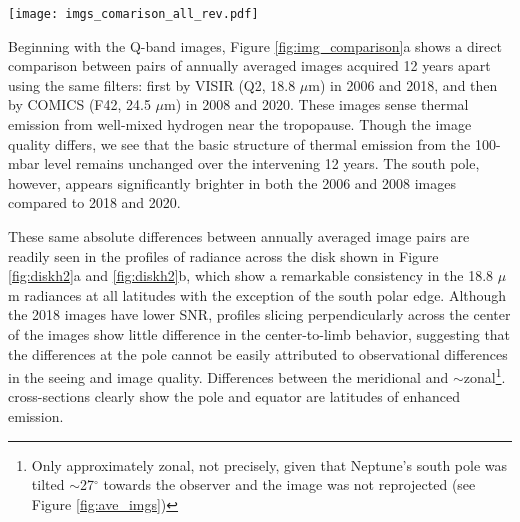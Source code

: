 \documentclass[twocolumn,10pt]{aastex631}
\begin{document}
\begin{figure*}
    \centering
    \texttt{[image: imgs\_comarison\_all\_rev.pdf]}
    \caption{Comparison of observed radiances in images from different years. On the left, images with identical filters are compared over time in the different spectral regions as described in the text for images sensitive to a) H$_2$, b) C$_2$H$_6$, c) CH$_3$D, and d) CH$_4$.  On the right, image sequences including all filters, normalized relative to Spitzer disk-filter-integrated radiances and scaled by a single fiducial value for each spectral group---specifically the Spitzer filter-integrated values for Q2 (H$_2$), NeII$\_$1 (C$_2$H$_6$),  PAH1 (CH$_3$D), and J7.9 (CH$_4$). Variation in methane images d) are largest, and indicate significant global changes in radiances or larger calibration uncertainties than expected. Uncertainties are assumed to be up to 10\% for ethane images (11--13 $\mu$m), 20\% for the CH$_3$D images (8--9 $\mu$m), 25\% for methane images (7--8 $\mu$m), and no more than 30\% for hydrogen images (17--25 $\mu$m). }
    \label{fig:img_comparison}
\end{figure*}

Beginning with the Q-band images, Figure \ref{fig:img_comparison}a shows a direct comparison between pairs of annually averaged images acquired 12 years apart using the same filters:  first by VISIR (Q2, 18.8 $\mu$m) in 2006 and 2018, and then by COMICS (F42, 24.5 $\mu$m) in 2008 and 2020. These images sense thermal emission from well-mixed hydrogen near the tropopause. Though the image quality differs, we see that the basic structure of thermal emission from the 100-mbar level remains unchanged over the intervening 12 years.  The south pole, however, appears significantly brighter in both the 2006 and 2008 images compared to 2018 and 2020.  

These same absolute differences between annually averaged image pairs are readily seen in the profiles of radiance across the disk shown in Figure \ref{fig:diskh2}a and \ref{fig:diskh2}b, which show a remarkable consistency in the 18.8 $\mu$m radiances at all latitudes with the exception of the south polar edge. Although the 2018 images have lower SNR, profiles slicing perpendicularly across the center of the images show little difference in the center-to-limb behavior, suggesting that the differences at the pole cannot be easily attributed to observational differences in the seeing and image quality. Differences between the meridional and $\sim$zonal\footnote{Only approximately zonal, not precisely, given that Neptune's south pole was tilted $\sim$27$^{\circ}$ towards the observer and the image was not reprojected (see Figure \ref{fig:ave_imgs})}. cross-sections clearly show the pole and equator are latitudes of enhanced emission.  
\end{document}
